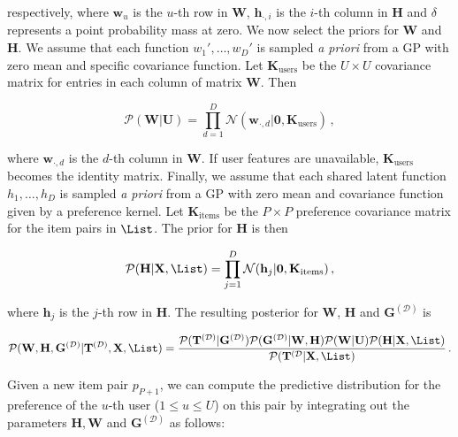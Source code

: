 respectively, where $\mathbf{w}_u$ is the $u$-th row in $\mathbf{W}$, $\mathbf{h}_{\cdot,i}$ is the $i$-th column in $\mathbf{H}$ and $\delta$ represents a point probability mass at zero. We now select the priors for $\mathbf{W}$ and $\mathbf{H}$.  We assume that each function $w_1',\ldots,w_D'$ is sampled \textit{a priori} from a GP with zero mean and specific covariance function. Let $\mathbf{K}_\text{users}$ be the $U \times U$ covariance matrix for entries in each column of matrix $\mathbf{W}$. Then

\begin{equation}
	\mathcal{P}(\mathbf{W}|\mathbf{U})=  
	\prod_{d=1}^D \mathcal{N}(\mathbf{w}_{\cdot,d}|\mathbf{0},\mathbf{K}_\text{users})\,,\label{eqn:preference_priorW}
\end{equation}

where $\mathbf{w}_{\cdot,d}$ is the $d$-th column in $\mathbf{W}$. If user features are unavailable, $\mathbf{K}_\text{users}$ becomes the identity matrix. Finally, we assume that each shared latent function $h_1,\ldots,h_D$ is sampled \textit{a priori} from a GP with zero mean and covariance function given by a preference kernel.  Let $\mathbf{K}_\text{items}$ be the $P \times P$ preference covariance  matrix for the item pairs in $\List$. The prior for $\mathbf{H}$ is then 

\begin{equation}
	\mathcal{P}(\mathbf{H}|\mathbf{X},\List) = 
	\prod_{j=1}^{D}\mathcal{N}(\mathbf{h}_j|\mathbf{0},\mathbf{K}_\text{items})\,,\label{eqn:preference_priorH}
\end{equation}

where $\mathbf{h}_j$ is the $j$-th row in $\mathbf{H}$. The resulting posterior for $\mathbf{W}$, $\mathbf{H}$ and $\mathbf{G}^{(\mathcal{D})}$ is

\begin{equation}
	\mathcal{P}(\mathbf{W},\mathbf{H},\mathbf{G}^{(\mathcal{D})}|\mathbf{T}^{(\mathcal{D})},\mathbf{X},\List) =
	\frac{\mathcal{P}(\mathbf{T}^{(\mathcal{D})}|\mathbf{G}^{(\mathcal{D})})
	\mathcal{P}(\mathbf{G}^{(\mathcal{D})}|\mathbf{W},\mathbf{H})\mathcal{P}(\mathbf{W}|\mathbf{U})\mathcal{P}(\mathbf{H}|\mathbf{X},\List)} 
	{\mathcal{P}(\mathbf{T}^{(\mathcal{D}}|\mathbf{X},\List)}\,.\label{eqn:preference_post}
\end{equation}

Given a new item pair $p_{P+1}$, we can compute the predictive distribution for the preference of the $u$-th user ($1 \leq u \leq U$) on this pair by integrating out the parameters $\mathbf{H},\mathbf{W}$ and $\mathbf{G}^{(\mathcal{D})}$ as follows:

